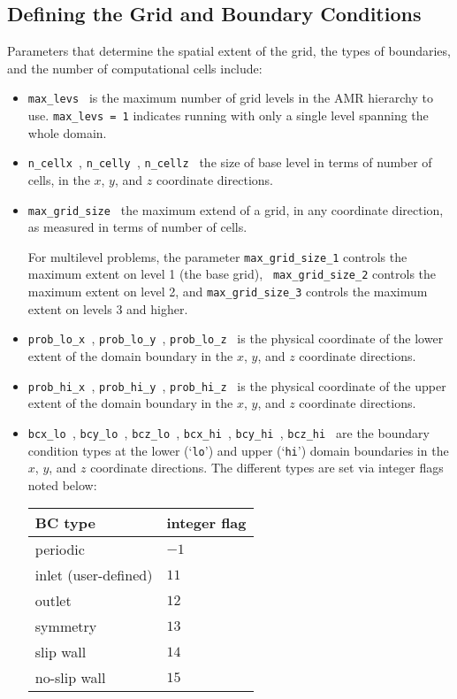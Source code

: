 \subsection{Defining the Grid and Boundary Conditions}

Parameters that determine the spatial extent of the grid, 
the types of boundaries, and the number of computational cells include:
\begin{itemize}

\item {\tt max\_levs } is the maximum number of grid levels in the AMR
  hierarchy to use.  {\tt max\_levs = 1} indicates running with only a
  single level spanning the whole domain.

\item {\tt n\_cellx }, {\tt n\_celly }, {\tt n\_cellz } the size of
  base level in terms of number of cells, in the $x$, $y$, and $z$
  coordinate directions.

\item {\tt max\_grid\_size } the maximum extend of a grid, in any
  coordinate direction, as measured in terms of number of cells.

  For multilevel problems, the parameter {\tt max\_grid\_size\_1}
  controls the maximum extent on level 1 (the base grid), {\tt
    max\_grid\_size\_2} controls the maximum extent on level 2, and
  {\tt max\_grid\_size\_3} controls the maximum extent on levels 3 and
  higher.

\item {\tt prob\_lo\_x }, {\tt prob\_lo\_y }, {\tt prob\_lo\_z } is
  the physical coordinate of the lower extent of the domain boundary
  in the $x$, $y$, and $z$ coordinate directions.

\item {\tt prob\_hi\_x }, {\tt prob\_hi\_y }, {\tt prob\_hi\_z } is
  the physical coordinate of the upper extent of the domain boundary
  in the $x$, $y$, and $z$ coordinate directions.

\item {\tt bcx\_lo }, {\tt bcy\_lo }, {\tt bcz\_lo }, 
      {\tt bcx\_hi }, {\tt bcy\_hi }, {\tt bcz\_hi } are the boundary
   condition types at the lower (`{\tt lo}') and upper (`{\tt hi}')
   domain boundaries in the $x$, $y$, and $z$ coordinate directions.
   The different types are set via integer flags noted below: 

   \begin{center}
   \begin{tabular}{ll}
   \hline
   BC type    & integer flag \\
   \hline
   periodic             & $-1$ \\
   inlet (user-defined) & $11$ \\
   outlet               & $12$ \\
   symmetry             & $13$ \\
   slip wall            & $14$ \\
   no-slip wall         & $15$ \\
   \hline
   \end{tabular}
   \end{center}


\end{itemize}

